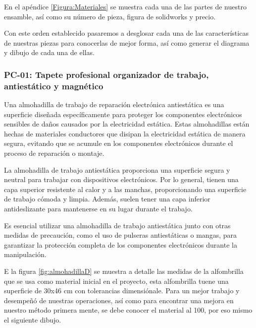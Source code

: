     En el apéndice \ref{Figura:Materiales} se muestra cada una de las partes de nuestro ensamble, así como su número de pieza, figura de solidworks y precio.
    
    Con este orden establecido pasaremos a desglosar cada una de las características de nuestras piezas para conocerlas de mejor forma, así como generar  el diagrama y dibujo de cada una de ellas.
    
    \subsubsection{PC-01: Tapete profesional organizador de trabajo, antiestático y magnético}
    
    Una almohadilla de trabajo de reparación electrónica antiestática es una superficie diseñada específicamente para proteger los componentes electrónicos sensibles de daños causados por la electricidad estática. Estas almohadillas están hechas de materiales conductores que disipan la electricidad estática de manera segura, evitando que se acumule en los componentes electrónicos durante el proceso de reparación o montaje.
    
    La almohadilla de trabajo antiestática proporciona una superficie segura y neutral para trabajar con dispositivos electrónicos. Por lo general, tienen una capa superior resistente al calor y a las manchas, proporcionando una superficie de trabajo cómoda y limpia. Además, suelen tener una capa inferior antideslizante para mantenerse en su lugar durante el trabajo.
    
    Es esencial utilizar una almohadilla de trabajo antiestática junto con otras medidas de precaución, como el uso de pulseras antiestáticas o mangas, para garantizar la protección completa de los componentes electrónicos durante la manipulación.
    
    
    E la figura \ref{fig:almohadillaD} se muestra a detalle las medidas de la alfombrilla que se usa como material inicial en el proyecto, esta alfombrilla tuene una superficie de 30x46 cm con tolerancias dimensiónale. Para un mejor trabajo y desempeñó de nuestras operaciones, así como para encontrar una mejora en nuestro método primera mente, se debe conocer el material al 100, por eso mismo el siguiente dibujo.
    
